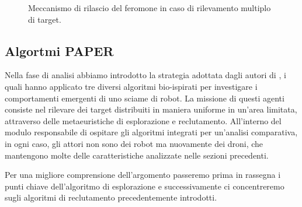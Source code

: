 \begin{figure}[H] 
    \captionsetup{justification=centering, margin=2cm, font=footnotesize}
    \begin{center}
    \end{center}
    \caption{Meccanismo di rilascio del feromone in caso di rilevamento multiplo di target.}
    \label{rilevamento_multiplo_target}
\end{figure}



\subsection{Algortmi PAPER}

Nella fase di analisi abbiamo introdotto la strategia adottata dagli autori di \cite{palmieri2017comparison}, i quali hanno applicato tre diversi algoritmi bio-ispirati per investigare i comportamenti emergenti di uno sciame di robot.
La missione di questi agenti consiste nel rilevare dei target distribuiti in maniera uniforme in un'area limitata, attraverso delle metaeuristiche di esplorazione e reclutamento.
All'interno del modulo responsabile di ospitare gli algoritmi integrati per un'analisi comparativa, in ogni caso, gli attori non sono dei robot ma nuovamente dei droni, che mantengono molte delle caratteristiche analizzate nelle sezioni precedenti.

Per una migliore comprensione dell'argomento passeremo prima in rassegna i punti chiave dell'algoritmo di esplorazione e successivamente ci concentreremo sugli algoritmi di reclutamento precedentemente introdotti.

